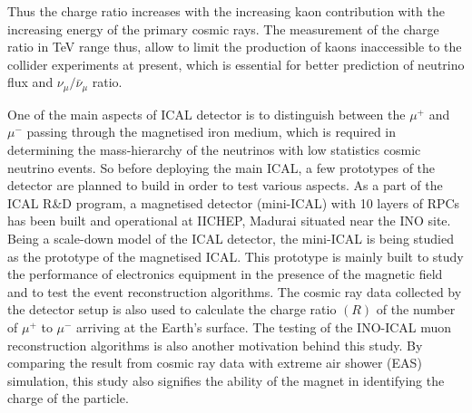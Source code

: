 Thus the charge ratio increases with the increasing kaon contribution
with the increasing energy of the primary cosmic rays.
The measurement of the charge ratio in TeV range thus, allow to limit
the production of kaons inaccessible to the collider experiments
at present, which is essential for better prediction of neutrino
flux and $\nu_{\mu}/\bar{\nu}_{\mu}$ ratio.

One of the main aspects of ICAL detector is to distinguish between
the $\mu^{+}$ and $\mu^{-}$ passing through the magnetised iron
medium, which is required in determining the mass-hierarchy of
the neutrinos with low statistics cosmic neutrino events.
  So before deploying the main ICAL, a few prototypes
of the detector are planned to build in order to test various aspects.
As a part of the ICAL R\&D program, a magnetised detector (mini-ICAL)
with 10 layers of RPCs has been built and operational at IICHEP,
Madurai situated near the INO site. Being a scale-down model of the
ICAL detector, the mini-ICAL is being studied as the prototype of
the magnetised ICAL. This prototype is mainly built to study the
performance of electronics equipment in the presence of the magnetic
field and to test the event reconstruction algorithms.
The cosmic ray data collected by the
detector setup is also used to calculate the charge ratio $(R)$
of the number of $\mu^{+}$ to $\mu^{-}$ arriving at the Earth's surface.
The testing of the INO-ICAL muon reconstruction algorithms is also another
motivation behind this study.
By comparing the result from cosmic ray data with extreme
air shower (EAS) simulation, this study also signifies the ability of
the magnet in identifying the charge of the particle.

